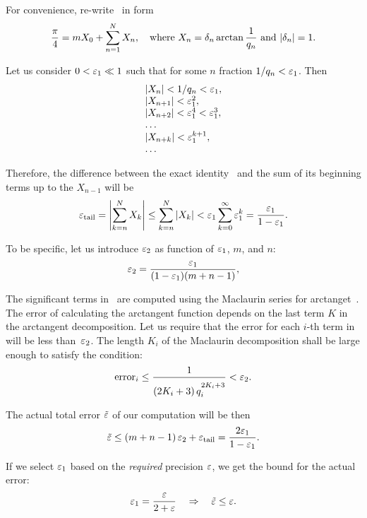 \documentclass[draft, 10pt]{article} %
\begin{document}
For convenience, re-write~ in form
%
\begin{equation}\mlabel{machin-x}
\dfrac{\pi}{4} = m X_0 + \ds\sum_{n=1}^N X_n, \quad
    \hbox{where $X_n = \delta_n \arctan\dfrac{1}{q_n}$ and $\absolute{\delta_n} = 1$.}
\end{equation}

Let us consider $0 < \varepsilon_1 \ll 1$ such that for some $n$ fraction $1/q_n < \varepsilon_1$.
Then
$$
\begin{array}{l}
\left| X_n \right| < 1/q_n < \varepsilon_1, \\
\left| X_{n+1} \right| < \varepsilon_1^2, \\
\left| X_{n+2} \right| < \varepsilon_1^4 < \varepsilon_1^3, \\
\dots \\
\left| X_{n+k} \right| < \varepsilon_1^{k+1}, \\
\dots \\
\end{array}
$$

Therefore, the difference between the exact identity~ and the sum
of its beginning terms up to the $X_{n-1}$ will be
$$
\varepsilon_{\mathrm{tail}} = \left| \displaystyle\sum_{k=n}^N X_k \right| \le \displaystyle\sum_{k=n}^N \left| X_k \right|
    < \varepsilon_1 \displaystyle\sum_{k=0}^\infty \varepsilon_1^k = \displaystyle\frac{\varepsilon_1}{1-\varepsilon_1}.
$$

To be specific, let us introduce $\varepsilon_2$ as function of $\varepsilon_1$, $m$, and $n$:
$$
\varepsilon_2 = \displaystyle\frac{\varepsilon_1}{(1-\varepsilon_1)(m+n-1)},
$$

The significant terms in~ are computed using the Maclaurin series for
arctanget~. The error of calculating the arctangent function
depends on the last term $K$ in the arctangent decomposition.
Let us require that the error for each $i$-th term in~
will be less than~$\varepsilon_2$. The length $K_i$ of the Maclaurin decomposition
shall be large enough to satisfy the condition:
$$
\mathrm{error}_i \le \displaystyle\frac{1}{(2K_i+3) \, q_i^{2K_i+3\strut}} < \varepsilon_2.
$$

The actual total error $\tilde{\varepsilon}$ of our computation will be then
$$
\tilde{\varepsilon} \le (m+n-1) \, \varepsilon_2 + \varepsilon_{\mathrm{tail}} = \displaystyle\frac{2 \varepsilon_1}{1-\varepsilon_1}.
$$

If we select $\varepsilon_1$ based on the {\it required\/} precision $\varepsilon$, we get the bound for
the actual error:
%
\begin{equation}\mlabel{partial-precision}
\eps_1 = \dfrac{\eps}{2+\eps} \quad\ergo\quad \tilde\eps \le \eps.
\end{equation}
\end{document}
